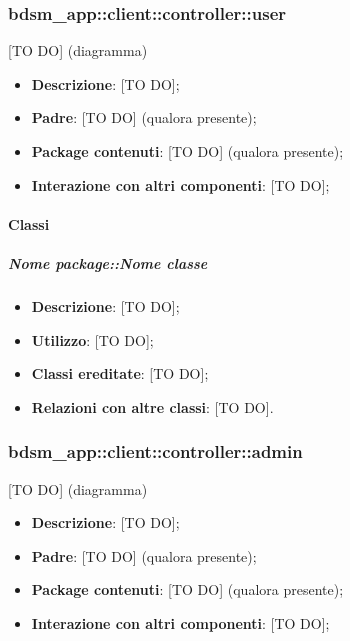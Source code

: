 	\subsubsection{bdsm\_app::client::controller::user} %
	\label{ssub:bdsm_app_client_controller_user}
	[TO DO] (diagramma) \newline \newline

	\begin{itemize}
		\item \textbf{Descrizione}: [TO DO];
		\item \textbf{Padre}: [TO DO] (qualora presente);
		\item \textbf{Package contenuti}: [TO DO] (qualora presente);
		\item \textbf{Interazione con altri componenti}: [TO DO];
	\end{itemize}

		\paragraph{Classi} %
			\subparagraph{Nome package::Nome classe} %
			\label{subp:subparagraph_name}
				\begin{itemize}
					\item \textbf{Descrizione}: [TO DO];
					\item \textbf{Utilizzo}: [TO DO];
					\item \textbf{Classi ereditate}: [TO DO];
					\item \textbf{Relazioni con altre classi}: [TO DO].
				\end{itemize}

	\subsubsection{bdsm\_app::client::controller::admin} %
	\label{ssub:bdsm_app_client_controller_admin}
	[TO DO] (diagramma) \newline \newline

	\begin{itemize}
		\item \textbf{Descrizione}: [TO DO];
		\item \textbf{Padre}: [TO DO] (qualora presente);
		\item \textbf{Package contenuti}: [TO DO] (qualora presente);
		\item \textbf{Interazione con altri componenti}: [TO DO];
	\end{itemize}

